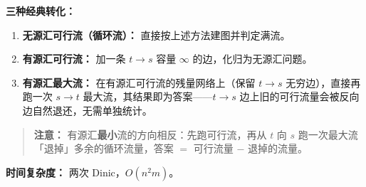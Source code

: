 \textbf{三种经典转化：}
\begin{enumerate}
  \item \textbf{无源汇可行流（循环流）：} 直接按上述方法建图并判定满流。
  \item \textbf{有源汇可行流：} 加一条 $t \to s$ 容量 $\infty$ 的边，化归为无源汇问题。
  \item \textbf{有源汇最大流：} 在有源汇可行流的残量网络上（保留 $t \to s$ 无穷边），直接再跑一次 $s \to t$ 最大流，其结果即为答案——$t \to s$ 边上旧的可行流量会被反向边自然退还，无需单独统计。
\end{enumerate}

\begin{quote}
\textbf{注意：} 有源汇\textbf{最小}流的方向相反：先跑可行流，再从 $t$ 向 $s$ 跑一次最大流「退掉」多余的循环流量，答案 $=$ 可行流量 $-$ 退掉的流量。
\end{quote}

\textbf{时间复杂度：} 两次 Dinic，$O(n^2 m)$。


